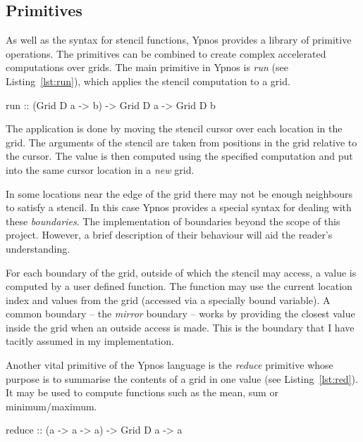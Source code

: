 \documentclass[12pt,a4paper,twoside]{scrbook}
\begin{document}
\subsection{Primitives}

As well as the syntax for stencil functions, Ypnos provides a library of
primitive operations. The primitives can be combined to create complex
accelerated computations over grids. The main primitive in Ypnos is \emph{run}
(see Listing~\ref{lst:run}), which applies the stencil computation to a grid.

\begin{hflisting}[label={lst:run}, caption=The basic run primitive as defined in
  the original Ypnos paper\cite{ypnos-damp10}.]
run :: (Grid D a -> b) -> Grid D a -> Grid D b
\end{hflisting}

The application is done by moving the stencil cursor over each location
in the grid. The arguments of the stencil are taken from positions in
the grid relative to the cursor. The value is then computed using the
specified computation and put into the same cursor location in a
\emph{new} grid.

In some locations near the edge of the grid there may not be enough neighbours
to satisfy a stencil. In this case Ypnos provides a special syntax for dealing
with these \emph{boundaries}. The implementation of boundaries beyond the scope
of this project. However, a brief description of their behaviour will aid the
reader's understanding.

For each boundary of the grid, outside of which the stencil may access, a value
is computed by a user defined function. The function may use the current
location index and values from the grid (accessed via a specially bound
variable). A common boundary -- the \emph{mirror} boundary -- works by providing
the closest value inside the grid when an outside access is made. This is the
boundary that I have tacitly assumed in my implementation.

Another vital primitive of the Ypnos language is the \emph{reduce} primitive
whose purpose is to summarise the contents of a grid in one value (see
Listing~\ref{lst:red}). It may be used to compute functions such as the mean,
sum or minimum/maximum.

\begin{hflisting}[label={lst:red}, caption=The basic reduction primitive as
  defined in the original Ypnos paper.]
reduce :: (a -> a -> a) -> Grid D a -> a
\end{hflisting}
\end{document}
